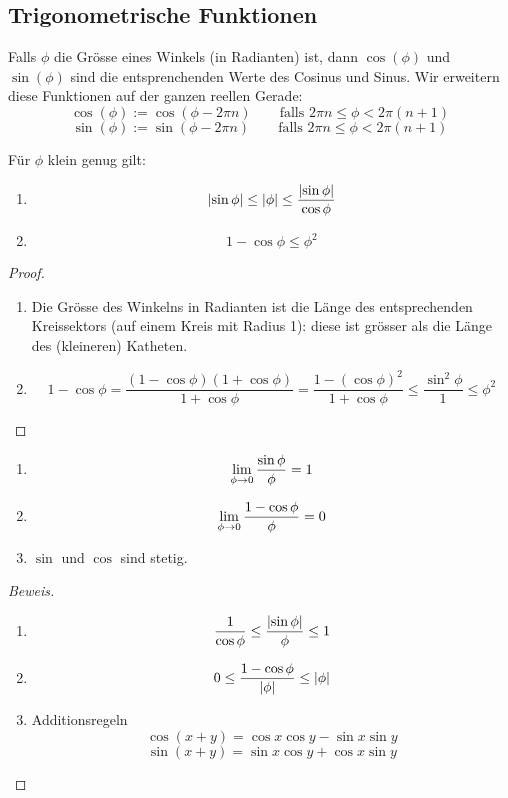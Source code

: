 \subsection{Trigonometrische Funktionen}
\begin{Def} Falls $\phi$ die Gr\"osse eines Winkels (in Radianten) ist,
dann $\cos (\phi)$ und $\sin (\phi)$ sind die entsprenchenden Werte des
Cosinus und Sinus. Wir erweitern diese Funktionen auf der ganzen reellen
Gerade:
  \[\cos(\phi):=\cos(\phi-2\pi n) \qquad \mbox{falls } 2\pi n \leq \phi < 2\pi (n+1)\]
  \[\sin(\phi):=\sin(\phi-2\pi n) \qquad \mbox{falls } 2\pi n \leq \phi < 2\pi (n+1)\]
\end{Def}
\begin{Sat}
  Für $\phi$ klein genug gilt:
  \begin{enumerate}
    \item 
      \[\mathopen| \sin\phi \mathclose|\leq\mathopen| \phi \mathclose|\leq\frac{\mathopen| \sin\phi \mathclose|}{\cos\phi}\]
    \item
      \[1-\cos\phi\leq\phi^2\]
  \end{enumerate}
\end{Sat}
\begin{proof}
  \begin{enumerate}
    \item Die Gr\"osse des Winkelns in Radianten ist die L\"ange des
entsprechenden Kreissektors (auf einem Kreis mit Radius 1): diese ist
gr\"osser als die L\"ange des (kleineren) Katheten.
    \item
      \[1-\cos\phi=\frac{(1-\cos\phi)(1+\cos\phi)}{1+\cos\phi}=\frac{1-(\cos\phi)^2}{1+\cos\phi}\leq\frac{\sin^2\phi}{1}\leq\phi^2\]
  \end{enumerate}
\end{proof}
\begin{Kor}
  \begin{enumerate}
    \item \[\displaystyle\lim_{\phi\rightarrow0}\frac{\sin\phi}{\phi}=1\]
    \item \[\displaystyle\lim_{\phi\rightarrow0}\frac{1-\cos\phi}{\phi}=0\]
    \item $\sin$ und $\cos$ sind stetig.
  \end{enumerate}
\end{Kor}
\begin{proof}[Beweis]
  \begin{enumerate}
    \item \[\frac{1}{\cos\phi}\leq\frac{\mathopen| \sin\phi \mathclose|}{\phi}\leq 1\]
    \item \[0\leq\frac{1-\cos\phi}{\mathopen| \phi \mathclose|}\leq\mathopen| \phi \mathclose|\]
    \item Additionsregeln
      \[\cos(x+y)=\cos x\cos y-\sin x\sin y\]
      \[\sin(x+y)=\sin x\cos y+\cos x\sin y\]
  \end{enumerate}
\end{proof}

